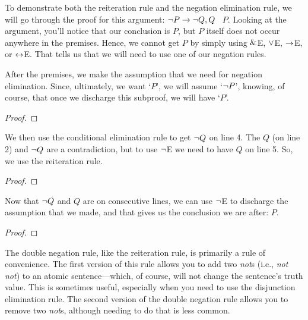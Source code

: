 
To demonstrate both the reiteration rule and the negation elimination rule, we will go through the proof for this argument: ${\neg} P \rightarrow {\neg} Q, Q$ \therefore\ $P$. Looking at the argument, you'll notice that our conclusion is $P$, but $P$ itself does not occur anywhere in the premises. Hence, we cannot get $P$ by simply using $\mathbin{\&}$E, $\vee$E, $\rightarrow$E, or $\leftrightarrow$E. That tells us that we will need to use one of our negation rules.

After the premises, we make the assumption that we need for negation elimination. Since, ultimately, we want `$P$', we will assume `${\neg} P$', knowing, of course, that once we discharge this subproof, we will have `$P$'.

\begin{proof}
	 	
	 
	\open
\end{proof}
We then use the conditional elimination rule to get ${\neg} Q$ on line 4. The $Q$ (on line 2) and ${\neg} Q$ are a contradiction, but to use ${\neg}$E we need to have $Q$ on line 5. So, we use the reiteration rule. 

\begin{proof}
	 	
	 
	\open
\end{proof}
Now that ${\neg} Q$ and $Q$ are on consecutive lines, we can use ${\neg}$E to discharge the assumption that we made, and that gives us the conclusion we are after: $P$.

\begin{proof}
	 	
	 
	\open
	\close
\end{proof}

The double negation rule, like the reiteration rule, is primarily a rule of convenience. The first version of this rule allows you to add two \textit{not}s (i.e., \textit{not not}) to an atomic sentence---which, of course, will not change the sentence's truth value. This is sometimes useful, especially when you need to use the disjunction elimination rule. The second version of the double negation rule allows you to remove two \textit{not}s, although needing to do that is less common.

